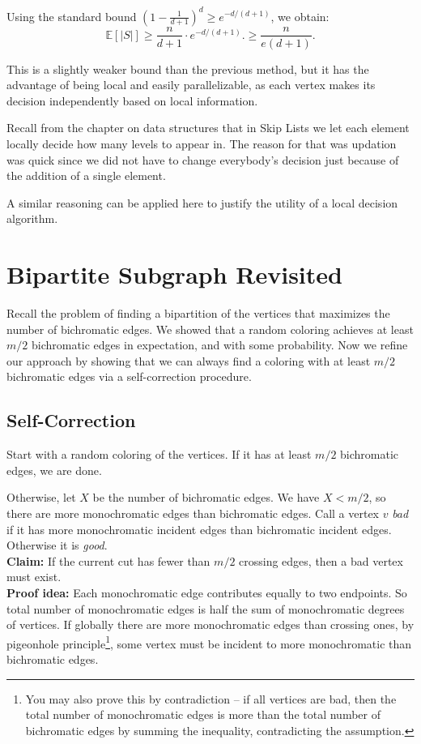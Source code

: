Using the standard bound \(\left(1-\frac{1}{d+1}\right)^d \ge e^{-d/(d+1)}\), we obtain:
\[
\mathbb{E}[|S|]\ge \frac{n}{d+1}\cdot e^{-d/(d+1)}. \ge \frac{n}{e(d+1)}.
\]

This is a slightly weaker bound than the previous method, but it has the advantage of being local and easily parallelizable, 
as each vertex makes its decision independently based on local information. 

Recall from the chapter on data structures that in Skip Lists we let each element 
locally decide how many levels to appear in. The reason for that was updation was quick 
since we did not have to change everybody's decision just because of the addition of a single element.

A similar reasoning can be applied here to justify the utility of a local decision algorithm.
\section{Bipartite Subgraph Revisited}

Recall the problem of finding a bipartition of the vertices that maximizes the number of bichromatic edges. 
We showed that a random coloring achieves at least $m/2$ bichromatic edges in expectation, and with some probability. 
Now we refine our approach by showing that we can always find a coloring with at least $m/2$ bichromatic edges via a self-correction procedure.
\subsection{Self-Correction}

Start with a random coloring of the vertices. If it has at least $m/2$ bichromatic edges, we are done. 

Otherwise, let $X$ be the number of bichromatic edges. We have $X < m/2$, so there are more monochromatic edges than bichromatic edges.
Call a vertex $v$ \emph{bad} if it has more monochromatic incident edges than bichromatic incident edges. Otherwise it is \emph{good}.\\

\noindent\textbf{Claim:} If the current cut has fewer than $m/2$ crossing edges, then a bad vertex must exist.\\

\noindent\textbf{Proof idea:} Each monochromatic edge contributes equally to two endpoints.
So total number of monochromatic edges is half the sum of monochromatic degrees of vertices. 
If globally there are more monochromatic edges than crossing ones, 
by pigeonhole principle\footnote{You may also prove this by contradiction -- 
if all vertices are bad, then the total number of monochromatic edges is more than the total number of bichromatic edges by summing the inequality, contradicting the assumption.}, 
some vertex must be incident to more monochromatic than bichromatic edges.

